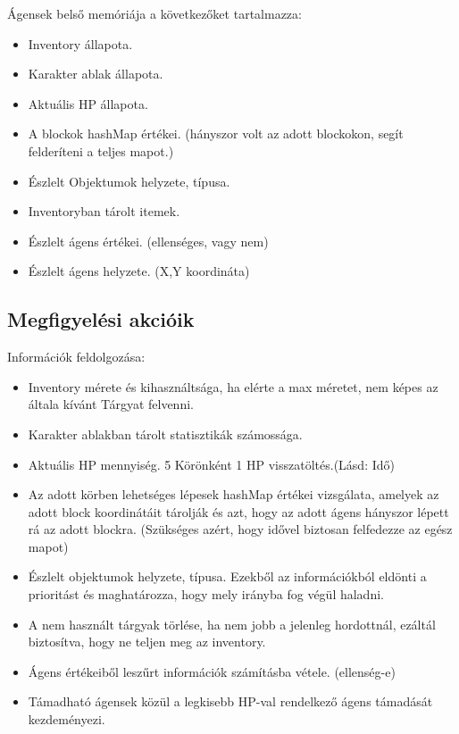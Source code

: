 \noindent Ágensek belső memóriája a következőket tartalmazza:
\begin{itemize}
    \item Inventory állapota.
    \item Karakter ablak állapota.
    \item Aktuális HP állapota.
    \item A blockok hashMap értékei. (hányszor volt az adott blockokon, segít felderíteni a teljes mapot.)
    \item Észlelt Objektumok helyzete, típusa.
    \item Inventoryban tárolt itemek.
    \item Észlelt ágens értékei. (ellenséges, vagy nem)
    \item Észlelt ágens helyzete. (X,Y koordináta)
\end{itemize}

\subsection{Megfigyelési akcióik}

\noindent Információk feldolgozása:
\begin{itemize}
    \item Inventory mérete és kihasználtsága, ha elérte a max méretet, nem képes az általa kívánt Tárgyat felvenni.
    \item Karakter ablakban tárolt statisztikák számossága.
    \item Aktuális HP mennyiség. 5 Körönként 1 HP visszatöltés.(Lásd: Idő)
    \item Az adott körben lehetséges lépesek hashMap értékei vizsgálata, amelyek az adott block koordinátáit tárolják és azt, hogy az adott ágens hányszor lépett rá az adott blockra. (Szükséges azért, hogy idővel biztosan felfedezze az egész mapot)
    \item Észlelt objektumok helyzete, típusa. Ezekből az információkból eldönti a prioritást és maghatározza, hogy mely irányba fog végül haladni.
    \item A nem használt tárgyak törlése, ha nem jobb a jelenleg hordottnál, ezáltál biztosítva, hogy ne teljen meg az inventory.
    \item Ágens értékeiből leszűrt információk számításba vétele. (ellenség-e)
    \item Támadható ágensek közül a legkisebb HP-val rendelkező ágens támadását kezdeményezi.
\end{itemize}


